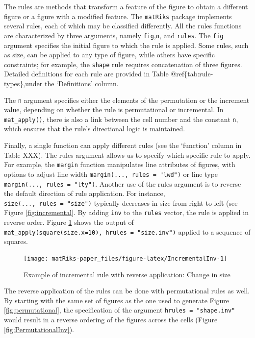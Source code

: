 The rules are methods that transform a feature of the figure to obtain a different figure or a figure with a modified feature.
The \texttt{matRiks} package implements several rules, each of which may be classified differently.
All the rules functions are characterized by three arguments, namely \texttt{fig},\texttt{n}, and \texttt{rules}.
The \texttt{fig} argument specifies the initial figure to which the rule is applied.
Some rules, such as size, can be applied to any type of figure, while others have specific constraints; for example, the \texttt{shape} rule requires concatenation of three figures.
Detailed definitions for each rule are provided in Table @ref\{tab:rule-types\},under the `Definitions' column.

The \texttt{n} argument specifies either the elements of the permutation or the increment value, depending on whether the rule is permutational or incremental.
In \texttt{mat\_apply()}, there is also a link between the cell number and the constant \texttt{n}, which ensures that the rule's directional logic is maintained.

Finally, a single function can apply different rules (see the `function' column in Table XXX).
The rules argument allows us to specify which specific rule to apply.
For example, the \texttt{margin} function manipulates line attributes of figures, with options to adjust line width \texttt{margin(...,\ rules\ =\ "lwd")} or line type \texttt{margin(...,\ rules\ =\ "lty")}.
Another use of the rules argument is to reverse the default direction of rule application.
For instance, \texttt{size(...,\ rules\ =\ "size")} typically decreases in size from right to left (see Figure \ref{fig:incremental}.
By adding \texttt{inv} to the \texttt{rules} vector, the rule is applied in reverse order.
Figure \ref{fig:IncrementalInv} shows the output of \texttt{mat\_apply(square(size.x=10),\ hrules\ =\ "size.inv")} applied to a sequence of squares.

\begin{figure}

{\centering \texttt{[image: matRiks-paper\_files/figure-latex/IncrementalInv-1]} 

}

\caption{Example of incremental rule with reverse application: Change in size}\label{fig:IncrementalInv}
\end{figure}

The reverse application of the rules can be done with permutational rules as well.
By starting with the same set of figures as the one used to generate Figure \ref{fig:permutational}, the specification of the argument \texttt{hrules\ =\ "shape.inv"} would result in a reverse ordering of the figures across the cells (Figure \ref{fig:PermutationalInv}).

